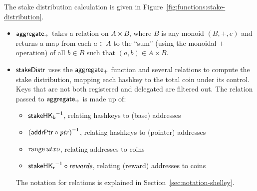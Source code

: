 The stake distribution calculation is given in Figure~\ref{fig:functions:stake-distribution}.

\begin{itemize}
\item $\mathsf{aggregate_{+}}$ takes a relation on $A\times B$, where $B$ is any
  monoid $(B,+,e)$ and returns a map from each $a\in A$ to the ``sum'' (using
  the monoidal $+$ operation) of all $b\in B$ such that $(a, b)\in A\times B$.
\item $\mathsf{stakeDistr}$ uses the $\mathsf{aggregate_{+}}$ function and several relations to
    compute the stake distribution, mapping each hashkey to the total coin under its control.
    Keys that are not both registered and delegated are filtered out.
    The relation passed to $\mathsf{aggregate_{+}}$ is made up of:
    \begin{itemize}
      \item $\mathsf{stakeHK_b}^{-1}$, relating hashkeys to (base) addresses
      \item $\left(\mathsf{addrPtr}\circ\mathit{ptr}\right)^{-1}$, relating hashkeys to (pointer)
        addresses
      \item $\operatorname{range}{utxo}$, relating addresses to coins
      \item $\mathsf{stakeHK_r}^{-1}\circ\mathit{rewards}$, relating (reward) addresses to coins
    \end{itemize}
    The notation for relations is explained in Section~\ref{sec:notation-shelley}.
\end{itemize}

